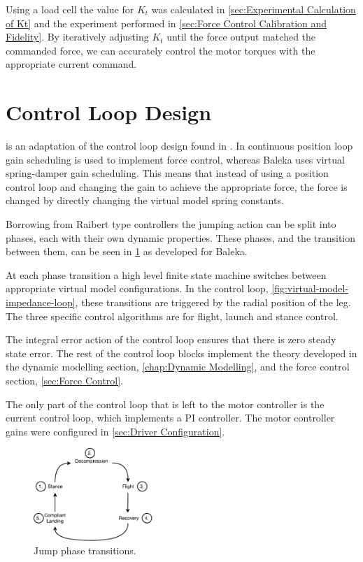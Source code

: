 Using a load cell the value for $K_t$ was calculated in \cref{sec:Experimental Calculation of Kt} and the experiment performed in \cref{sec:Force Control Calibration and Fidelity}. By iteratively adjusting $K_t$ until the force output matched the commanded force, we can accurately control the motor torques with the appropriate current command.

\section{Control Loop Design}
\label{sec:Control Loop Design}

 is an adaptation of the control loop design found in \cite{Kalouche2016}. In \cite{Kalouche2016} continuous position loop gain scheduling is used to implement force control, whereas Baleka uses virtual spring-damper gain scheduling. This means that instead of using a position control loop and changing the gain to achieve the appropriate force, the force is changed by directly changing the virtual model spring constants. 

Borrowing from Raibert type controllers the jumping action can be split into phases, each with their own dynamic properties. These phases, and the transition between them, can be seen in \cref{fig:phase-transitions} as developed for Baleka.

At each phase transition a high level finite state machine switches between appropriate virtual model configurations. In the control loop, \cref{fig:virtual-model-impedance-loop}, these transitions are triggered by the radial position of the leg. The three specific control algorithms are for flight, launch and stance control.

The integral error action of the control loop ensures that there is zero steady state error. The rest of the control loop blocks implement the theory developed in the dynamic modelling section, \cref{chap:Dynamic Modelling}, and the force control section, \cref{sec:Force Control}.

The only part of the control loop that is left to the motor controller is the current control loop, which implements a PI controller. The motor controller gains were configured in \cref{sec:Driver Configuration}.

\begin{figure}
\centering
\includegraphics[width=0.4\textwidth]{images/control/phase-transitions.pdf} 
\caption{Jump phase transitions.}
\label{fig:phase-transitions}
\end{figure}

